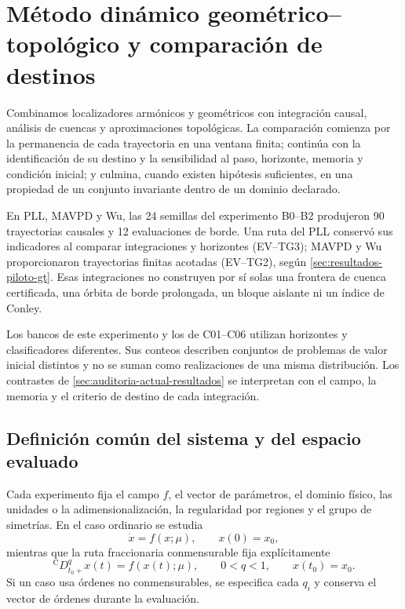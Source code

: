 \section[Campaña geométrico--topológica]
{Método dinámico geométrico--topológico y comparación de destinos}
\label{sec:campana-gt}

Combinamos localizadores armónicos y geométricos con integración causal,
análisis de cuencas y aproximaciones topológicas. La comparación comienza por
la permanencia de cada trayectoria en una ventana finita; continúa con la
identificación de su destino y la sensibilidad al paso, horizonte, memoria
y condición inicial; y culmina, cuando existen hipótesis suficientes, en
una propiedad de un conjunto invariante dentro de un dominio declarado.

En PLL, MAVPD y Wu, las 24 semillas del experimento B0--B2 produjeron
90 trayectorias causales y 12 evaluaciones de borde. Una ruta del PLL
conservó sus indicadores al comparar integraciones y horizontes (EV--TG3);
MAVPD y Wu proporcionaron trayectorias finitas acotadas (EV--TG2), según
\cref{sec:resultados-piloto-gt}. Esas integraciones no construyen por sí
solas una frontera de cuenca certificada, una órbita de borde prolongada,
un bloque aislante ni un índice de Conley.

Los bancos de este experimento y los de C01--C06 utilizan horizontes y
clasificadores diferentes. Sus conteos describen conjuntos de problemas de
valor inicial distintos y no se suman como realizaciones de una misma
distribución. Los contrastes de \cref{sec:auditoria-actual-resultados}
se interpretan con el campo, la memoria y el criterio de destino de cada
integración.

\subsection{Definición común del sistema y del espacio evaluado}
\label{camp:contrato-comun}

Cada experimento fija el campo \(f\), el
vector de parámetros, el dominio físico, las unidades o la
adimensionalización, la regularidad por regiones y el grupo de simetrías. En
el caso ordinario se estudia
\begin{equation}
 \dot x=f(x;\mu),\qquad x(0)=x_0,
 \label{camp:eq-ode-contract}
\end{equation}
mientras que la ruta fraccionaria conmensurable fija explícitamente
\begin{equation}
 {}^{\mathrm C}D_{t_0+}^{q}x(t)=f(x(t);\mu),
 \qquad 0<q<1,\qquad x(t_0)=x_0.
 \label{camp:eq-caputo-contract}
\end{equation}
Si un caso usa órdenes no conmensurables, se especifica cada \(q_i\) y
conserva el vector de órdenes durante la evaluación.

